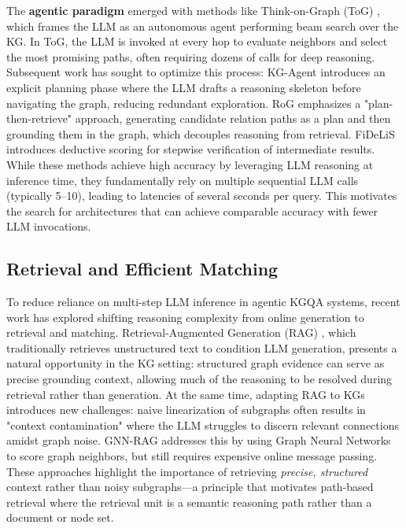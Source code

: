 \documentclass[conference]{IEEEtran}
\begin{document}
The \textbf{agentic paradigm} emerged with methods like Think-on-Graph (ToG) \cite{sun2024tog}, which frames the LLM as an autonomous agent performing beam search over the KG. In ToG, the LLM is invoked at every hop to evaluate neighbors and select the most promising paths, often requiring dozens of calls for deep reasoning. Subsequent work has sought to optimize this process: KG-Agent \cite{jiang2024kgagent} introduces an explicit planning phase where the LLM drafts a reasoning skeleton before navigating the graph, reducing redundant exploration. RoG \cite{luo2024rog} emphasizes a "plan-then-retrieve" approach, generating candidate relation paths as a plan and then grounding them in the graph, which decouples reasoning from retrieval. FiDeLiS \cite{sui2025fidelis} introduces deductive scoring for stepwise verification of intermediate results. While these methods achieve high accuracy by leveraging LLM reasoning at inference time, they fundamentally rely on multiple sequential LLM calls (typically 5--10), leading to latencies of several seconds per query. This motivates the search for architectures that can achieve comparable accuracy with fewer LLM invocations.

\subsection{Retrieval and Efficient Matching}

To reduce reliance on multi-step LLM inference in agentic KGQA systems, recent work has explored shifting reasoning complexity from online generation to retrieval and matching. Retrieval-Augmented Generation (RAG) \cite{lewis2020rag}, which traditionally retrieves unstructured text to condition LLM generation, presents a natural opportunity in the KG setting: structured graph evidence can serve as precise grounding context, allowing much of the reasoning to be resolved during retrieval rather than generation. At the same time, adapting RAG to KGs introduces new challenges: naive linearization of subgraphs \cite{pan2024kg-llm-survey} often results in "context contamination" where the LLM struggles to discern relevant connections amidst graph noise. GNN-RAG \cite{mavromatis2024gnnrag} addresses this by using Graph Neural Networks to score graph neighbors, but still requires expensive online message passing. These approaches highlight the importance of retrieving \emph{precise, structured} context rather than noisy subgraphs---a principle that motivates path-based retrieval where the retrieval unit is a semantic reasoning path rather than a document or node set.
\end{document}
